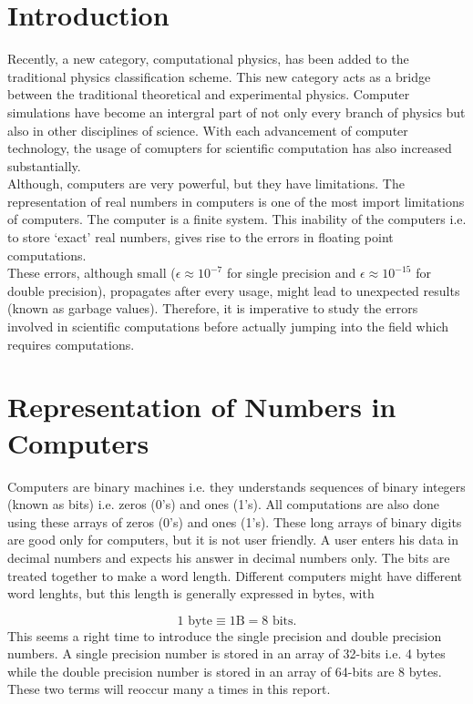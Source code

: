 \documentclass[a4,12pt]{article}
\numberwithin{equation}{subsection}
\begin{document}
\section{Introduction}
Recently, a new category, computational physics, has been added to the traditional physics classification scheme. This new category acts as a bridge between the traditional theoretical and experimental physics. Computer simulations have become an intergral part of not only every branch of physics but also in other disciplines of science. With each advancement of computer technology, the usage of comupters for scientific computation has also increased substantially.\\
\newline
Although, computers are very powerful, but they have limitations. The representation of real numbers in computers is one of the most import limitations of computers. The computer is a finite system. This inability of the computers i.e. to store `exact' real numbers, gives rise to the errors in floating point computations.\\
\newline
These errors, although small ($ \epsilon \approx 10^{-7}$ for single precision and $ \epsilon \approx 10^{-15}$ for double precision), propagates after every usage, might lead to unexpected results (known as garbage values). Therefore, it is imperative to study the errors involved in scientific computations before actually jumping into the field which requires computations.

\section{Representation of Numbers in Computers}
Computers are binary machines i.e. they understands sequences of binary integers (known as bits) i.e. zeros (0's) and ones (1's). All computations are also done using these arrays of zeros (0's) and ones (1's). These long arrays of binary digits are good only for computers, but it is not user friendly. A user enters his data in decimal numbers and expects his answer in decimal numbers only. The bits are treated together to make a word length. Different computers might have different word lenghts, but this length is generally expressed in bytes, with 

$$1 \text{ byte} \equiv 1 \text{B} = 8 \text{ bits}.$$
\newline
This seems a right time to introduce the single precision and double precision numbers. A single precision number is stored in an array of 32-bits i.e. 4 bytes while the double precision number is stored in an array of 64-bits are 8 bytes. These two terms will reoccur many a times in this report.
\end{document}
